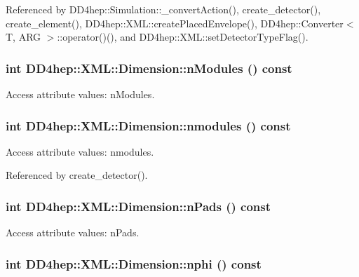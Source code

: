 Referenced by DD4hep::Simulation::\_\-convertAction(), create\_\-detector(), create\_\-element(), DD4hep::XML::createPlacedEnvelope(), DD4hep::Converter$<$ T, ARG $>$::operator()(), and DD4hep::XML::setDetectorTypeFlag().\hypertarget{struct_d_d4hep_1_1_x_m_l_1_1_dimension_a3f7ed58b279d16bfc445accca908def3}{
\subsubsection[{nModules}]{\setlength{\rightskip}{0pt plus 5cm}int DD4hep::XML::Dimension::nModules () const}}
\label{struct_d_d4hep_1_1_x_m_l_1_1_dimension_a3f7ed58b279d16bfc445accca908def3}


Access attribute values: nModules. \hypertarget{struct_d_d4hep_1_1_x_m_l_1_1_dimension_af226bfb45cf52f5ce88e8af8eb1bfa0b}{
\subsubsection[{nmodules}]{\setlength{\rightskip}{0pt plus 5cm}int DD4hep::XML::Dimension::nmodules () const}}
\label{struct_d_d4hep_1_1_x_m_l_1_1_dimension_af226bfb45cf52f5ce88e8af8eb1bfa0b}


Access attribute values: nmodules. 

Referenced by create\_\-detector().\hypertarget{struct_d_d4hep_1_1_x_m_l_1_1_dimension_adfcddfed059d44f9a531a62703b4df3f}{
\subsubsection[{nPads}]{\setlength{\rightskip}{0pt plus 5cm}int DD4hep::XML::Dimension::nPads () const}}
\label{struct_d_d4hep_1_1_x_m_l_1_1_dimension_adfcddfed059d44f9a531a62703b4df3f}


Access attribute values: nPads. \hypertarget{struct_d_d4hep_1_1_x_m_l_1_1_dimension_a37f4a14b3e7965d2f4b3ddefa871141a}{
\subsubsection[{nphi}]{\setlength{\rightskip}{0pt plus 5cm}int DD4hep::XML::Dimension::nphi () const}}
\label{struct_d_d4hep_1_1_x_m_l_1_1_dimension_a37f4a14b3e7965d2f4b3ddefa871141a}


